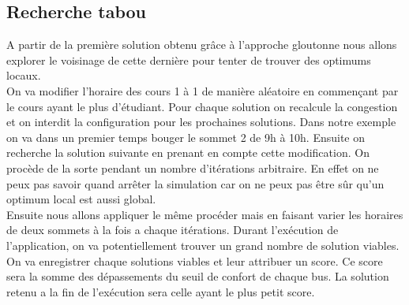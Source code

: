 \documentclass[a4paper,11pt]{article}
\begin{document}
 	\subsection{Recherche tabou}
 		A partir de la première solution obtenu grâce à l'approche gloutonne nous allons explorer le voisinage de cette dernière pour tenter de trouver des optimums locaux.\\
 		On va modifier l'horaire des cours 1 à 1 de manière aléatoire en commençant par le cours ayant le plus d'étudiant. Pour chaque solution on recalcule la congestion et on interdit la configuration pour les prochaines solutions. Dans notre exemple on va dans un premier temps bouger le sommet 2 de 9h à 10h. Ensuite on recherche la solution suivante en prenant en compte cette modification. On procède de la sorte pendant un nombre d'itérations arbitraire. En effet on ne peux pas savoir quand arrêter la simulation car on ne peux pas être sûr qu'un optimum local est aussi global.\\
 		Ensuite nous allons appliquer le même procéder mais en faisant varier les horaires de deux sommets à la fois a chaque itérations.
 		Durant l'exécution de l'application, on va potentiellement trouver un grand nombre de solution viables. On va enregistrer chaque solutions viables et leur attribuer un score. Ce score sera la somme des dépassements du seuil de confort de chaque bus. La solution retenu a la fin de l'exécution sera celle ayant le plus petit score.
\end{document}
